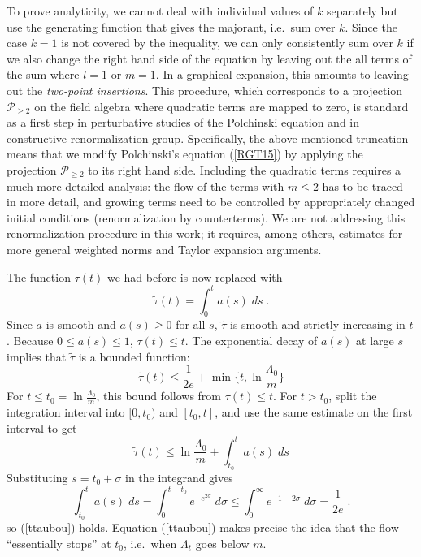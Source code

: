\documentclass[12pt,twoside]{amsart}
\newcommand{\beq}{\begin{equation}}
\newcommand{\eeq}{\end{equation}}
\newcommand{\cP}{{\mathcal{P}}}
\numberwithin{equation}{section}
\begin{document}
To prove analyticity, we cannot deal with individual values of $k$ separately but use the generating function that gives the majorant, i.e.\ sum over $k$. Since the case $k=1$ is not covered by the inequality, we can only consistently sum over $k$ if we also change the right hand side of the equation by leaving out the all terms of the sum where $l=1$ or $m=1$. In a graphical expansion, this amounts to leaving out the {\em two-point insertions}. This procedure, which corresponds to a projection $\cP_{\ge 2}$ on the field algebra where quadratic terms are mapped to zero, is standard as a first step in perturbative studies of the Polchinski equation and in constructive renormalization group. Specifically, the above-mentioned truncation means that we modify Polchinski's equation (\ref{RGT15}) by applying the projection $\cP_{\ge 2}$ to its right hand side. Including the quadratic terms requires a much more detailed analysis: the flow of the terms with $m \le 2$ has to be traced in more detail, and growing terms need to be controlled by appropriately changed initial conditions (renormalization by counterterms). We are not addressing this renormalization procedure in this work; it requires, among others, estimates for more general weighted norms and Taylor expansion arguments. 

The function $\tau(t)$ we had before is now replaced with
\beq
\tilde\tau (t)  = \int_0^t a(s) \; ds \; .
\eeq 
Since $a$ is smooth and $a(s) \ge 0$ for all $s$, $\tilde \tau$ is smooth and strictly increasing in $t$. 
Because $0 \le a(s) \le 1$, $\tau (t) \le t$. The exponential decay of $a(s)$ at large $s$ implies that $\tilde\tau$ is a bounded function:
\beq\label{ttaubou}
\tilde\tau(t) \le \frac{1}{2e} + \min\{ t, \ln \frac{\Lambda_0}{m} \}
\eeq
For $t \le t_0 = \ln \frac{\Lambda_0}{m}$, this bound follows from $\tau (t) \le t$.
For $t > t_0$, split the integration interval into $[0,t_0)$ and $[t_0,t]$, and use the same estimate on the first interval to get
\beq
\tilde\tau (t) \le \ln \frac{\Lambda_0}{m} + \int_{t_0}^t a(s) \; ds 
\eeq
Substituting $s = t_0 + \sigma$ in the integrand gives
\beq
\int_{t_0}^t a(s) \; ds
=
\int_0^{t-t_0} e^{-e^{2\sigma}} \; d\sigma
\le
\int_0^{\infty} e^{-1-2\sigma} \; d\sigma
=\frac{1}{2e} \; .
\eeq
so (\ref{ttaubou}) holds. Equation (\ref{ttaubou}) makes precise the idea that the flow ``essentially stops'' at $t_0$, i.e.\ when $\Lambda_t$ goes below $m$. 
\end{document}
